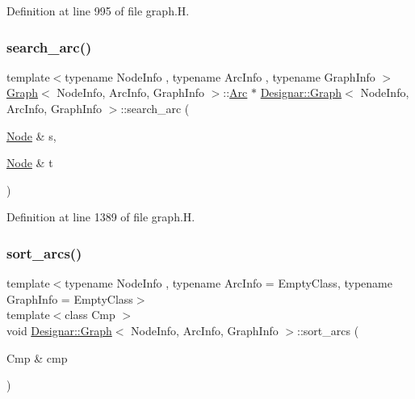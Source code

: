 Definition at line 995 of file graph.\+H.

\mbox{\label{class_designar_1_1_graph_afa69dd3cc6bacfed22864f5ad7c189ba}} 
\subsubsection{\texorpdfstring{search\+\_\+arc()}{search\_arc()}}
{\footnotesize\ttfamily template$<$typename Node\+Info , typename Arc\+Info , typename Graph\+Info $>$ \\
\hyperlink{class_designar_1_1_graph}{Graph}$<$ Node\+Info, Arc\+Info, Graph\+Info $>$\+::\hyperlink{class_designar_1_1_graph_a74c730ef4ce2d20f998d72bd25c2b5bf}{Arc} $\ast$ \hyperlink{class_designar_1_1_graph}{Designar\+::\+Graph}$<$ Node\+Info, Arc\+Info, Graph\+Info $>$\+::search\+\_\+arc (\begin{DoxyParamCaption}\item[{\hyperlink{class_designar_1_1_graph_a5dfc7dba9d092ac489c72e40390c37d0}{Node} \&}]{s,  }\item[{\hyperlink{class_designar_1_1_graph_a5dfc7dba9d092ac489c72e40390c37d0}{Node} \&}]{t }\end{DoxyParamCaption})}



Definition at line 1389 of file graph.\+H.

\mbox{\label{class_designar_1_1_graph_a39af536f6e08248e0d343dcd300713c2}} 
\subsubsection{\texorpdfstring{sort\+\_\+arcs()}{sort\_arcs()}\hspace{0.1cm}{\footnotesize\ttfamily [1/2]}}
{\footnotesize\ttfamily template$<$typename Node\+Info , typename Arc\+Info  = Empty\+Class, typename Graph\+Info  = Empty\+Class$>$ \\
template$<$class Cmp $>$ \\
void \hyperlink{class_designar_1_1_graph}{Designar\+::\+Graph}$<$ Node\+Info, Arc\+Info, Graph\+Info $>$\+::sort\+\_\+arcs (\begin{DoxyParamCaption}\item[{Cmp \&}]{cmp }\end{DoxyParamCaption})\hspace{0.3cm}{\ttfamily [inline]}}



